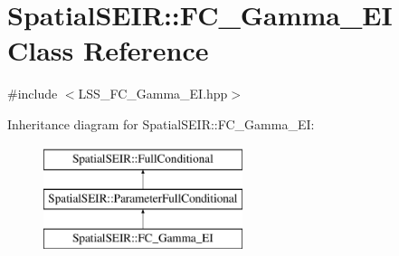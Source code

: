 \hypertarget{classSpatialSEIR_1_1FC__Gamma__EI}{\section{Spatial\-S\-E\-I\-R\-:\-:F\-C\-\_\-\-Gamma\-\_\-\-E\-I Class Reference}
\label{classSpatialSEIR_1_1FC__Gamma__EI}
}


{\ttfamily \#include $<$L\-S\-S\-\_\-\-F\-C\-\_\-\-Gamma\-\_\-\-E\-I.\-hpp$>$}

Inheritance diagram for Spatial\-S\-E\-I\-R\-:\-:F\-C\-\_\-\-Gamma\-\_\-\-E\-I\-:\begin{figure}[H]
\begin{center}
\leavevmode
\includegraphics[height=3.000000cm]{classSpatialSEIR_1_1FC__Gamma__EI}
\end{center}
\end{figure}
